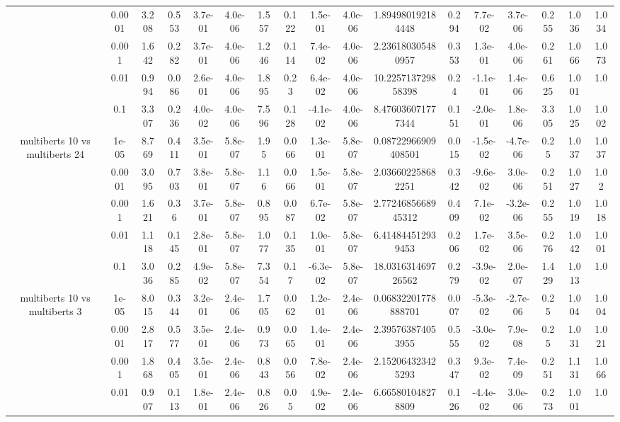 \begin{tabular}{|c|c|c|c|c|c|c|c|c|c|c|c|c|c|c|c|c|}
 & 0.0001 & 3.208 & 0.553 & 3.7e-01 & 4.0e-06 & 1.557 & 0.122 & 1.5e-01 & 4.0e-06 & 1.894980192184448 & 0.294 & 7.7e-02 & 3.7e-06 & 0.255 & 1.036 & 1.034 \\
 & 0.001 & 1.642 & 0.282 & 3.7e-01 & 4.0e-06 & 1.246 & 0.114 & 7.4e-02 & 4.0e-06 & 2.236180305480957 & 0.353 & 1.3e-01 & 4.0e-06 & 0.261 & 1.066 & 1.073 \\
 & 0.01 & 0.994 & 0.086 & 2.6e-01 & 4.0e-06 & 1.895 & 0.23 & 6.4e-02 & 4.0e-06 & 10.225713729858398 & 0.24 & -1.1e-01 & 1.4e-06 & 0.625 & 1.001 & 1.0 \\
 & 0.1 & 3.307 & 0.236 & 4.0e-02 & 4.0e-06 & 7.596 & 0.128 & -4.1e-02 & 4.0e-06 & 8.476036071777344 & 0.151 & -2.0e-01 & 1.8e-06 & 3.305 & 1.025 & 1.002 \\
\hline
\multirow{5}{*}{multiberts 10 vs multiberts 24} & 1e-05 & 8.769 & 0.411 & 3.5e-01 & 5.8e-07 & 1.95 & 0.066 & 1.3e-01 & 5.8e-07 & 0.08722966909408501 & 0.015 & -1.5e-02 & -4.7e-06 & 0.25 & 1.037 & 1.037 \\
 & 0.0001 & 3.095 & 0.703 & 3.8e-01 & 5.8e-07 & 1.16 & 0.066 & 1.5e-01 & 5.8e-07 & 2.036602258682251 & 0.342 & -9.6e-02 & 3.0e-06 & 0.251 & 1.027 & 1.02 \\
 & 0.001 & 1.621 & 0.36 & 3.7e-01 & 5.8e-07 & 0.895 & 0.087 & 6.7e-02 & 5.8e-07 & 2.7724685668945312 & 0.409 & 7.1e-02 & -3.2e-06 & 0.255 & 1.019 & 1.018 \\
 & 0.01 & 1.118 & 0.145 & 2.8e-01 & 5.8e-07 & 1.077 & 0.135 & 1.0e-01 & 5.8e-07 & 6.414844512939453 & 0.206 & 1.7e-02 & 3.5e-06 & 0.276 & 1.042 & 1.001 \\
 & 0.1 & 3.036 & 0.285 & 4.9e-02 & 5.8e-07 & 7.354 & 0.17 & -6.3e-02 & 5.8e-07 & 18.031631469726562 & 0.279 & -3.9e-02 & 2.0e-07 & 1.429 & 1.013 & 1.0 \\
\hline
\multirow{5}{*}{multiberts 10 vs multiberts 3} & 1e-05 & 8.015 & 0.344 & 3.2e-01 & 2.4e-06 & 1.705 & 0.062 & 1.2e-01 & 2.4e-06 & 0.06832201778888701 & 0.007 & -5.3e-02 & -2.7e-06 & 0.25 & 1.004 & 1.004 \\
 & 0.0001 & 2.817 & 0.577 & 3.5e-01 & 2.4e-06 & 0.973 & 0.065 & 1.4e-01 & 2.4e-06 & 2.395763874053955 & 0.555 & -3.0e-02 & 7.9e-08 & 0.25 & 1.031 & 1.021 \\
 & 0.001 & 1.868 & 0.405 & 3.5e-01 & 2.4e-06 & 0.843 & 0.056 & 7.8e-02 & 2.4e-06 & 2.152064323425293 & 0.347 & 9.3e-02 & 7.4e-09 & 0.251 & 1.131 & 1.066 \\
 & 0.01 & 0.907 & 0.113 & 1.8e-01 & 2.4e-06 & 0.826 & 0.05 & 4.9e-02 & 2.4e-06 & 6.665801048278809 & 0.126 & -4.4e-02 & 3.0e-06 & 0.273 & 1.001 & 1.0 \\

\end{tabular}
